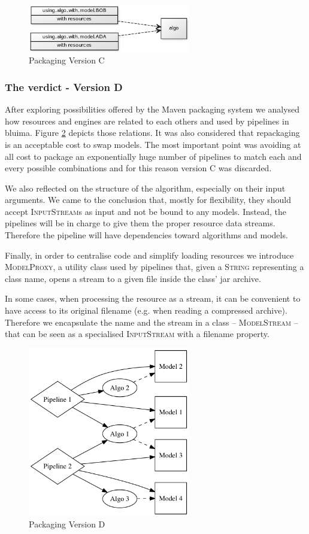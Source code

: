 \documentclass{article}
\newcommand{\id}[1]{\mbox{\textsc{#1}}}
\begin{document}
\begin{figure}
\centering
\includegraphics[width=200pt]{res/packaging_version_C.png}
\caption{Packaging Version C}
\label{fig:pkgsysC}
\end{figure}

\subsubsection{The verdict - Version D}

After exploring possibilities offered by the Maven packaging system we analysed how resources and engines are related to each others and used by pipelines in bluima. Figure \ref{fig:pkgsysD} depicts those relations. It was also considered that repackaging is an acceptable cost to swap models. The most important point was avoiding at all cost to package an exponentially huge number of pipelines to match each and every possible combinations and for this reason version C was discarded.

We also reflected on the structure of the algorithm, especially on their input arguments. We came to the conclusion that, mostly for flexibility, they should accept \id{InputStream}s as input and not be bound to any models. Instead, the pipelines will be in charge to give them the proper resource data streams. Therefore the pipeline will have dependencies toward algorithms and models.

Finally, in order to centralise code and simplify loading resources we introduce \id{ModelProxy}, a utility class used by pipelines that, given a \id{String} representing a class name, opens a stream to a given file inside the class' jar archive.

In some cases, when processing the resource as a stream, it can be convenient to have access to its original filename (e.g. when reading a compressed archive). Therefore we encapsulate the name and the stream in a class -- \id{ModelStream} -- that can be seen as a specialised \id{InputStream} with a filename property.

\begin{figure}
\centering
\includegraphics[width=200pt]{res/packaging_version_D.png}
\caption{Packaging Version D}
\label{fig:pkgsysD}
\end{figure}
\end{document}
